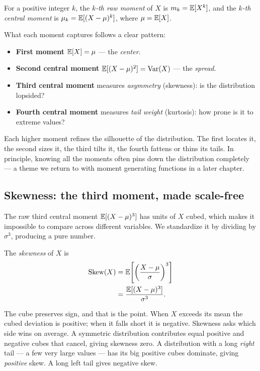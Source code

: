 \begin{definition}[Moments]
\label{ch09:def-moments}
For a positive integer $k$, the \emph{$k$-th raw moment} of $X$ is
$m_k = \operatorname{\mathbb{E}}[X^k]$, and the \emph{$k$-th central moment} is
$\mu_k = \operatorname{\mathbb{E}}[(X-\mu)^k]$, where $\mu = \operatorname{\mathbb{E}}[X]$.
\end{definition}

What each moment captures follows a clear pattern:

\begin{itemize}
  \item \textbf{First moment} $\operatorname{\mathbb{E}}[X] = \mu$ --- the \emph{center}.
  \item \textbf{Second central moment} $\operatorname{\mathbb{E}}[(X-\mu)^2] = \operatorname{Var}(X)$ --- the
        \emph{spread}.
  \item \textbf{Third central moment} measures \emph{asymmetry} (skewness):
        is the distribution lopsided?
  \item \textbf{Fourth central moment} measures \emph{tail weight}
        (kurtosis): how prone is it to extreme values?
\end{itemize}

Each higher moment refines the silhouette of the distribution. The first
locates it, the second sizes it, the third tilts it, the fourth fattens or
thins its tails. In principle, knowing all the moments often pins down the
distribution completely --- a theme we return to with moment generating
functions in a later chapter.

\subsection{Skewness: the third moment, made scale-free}

The raw third central moment $\operatorname{\mathbb{E}}[(X-\mu)^3]$ has units of $X$ cubed, which
makes it impossible to compare across different variables. We standardize it
by dividing by $\sigma^3$, producing a pure number.

\begin{definition}[Skewness]
\label{ch09:def-skew}
The \emph{skewness} of $X$ is
\begin{align*}
  \operatorname{Skew}(X) &= \operatorname{\mathbb{E}}\!\left[\left(\frac{X-\mu}{\sigma}\right)^{3}\right] \\
  &= \frac{\operatorname{\mathbb{E}}[(X-\mu)^3]}{\sigma^3}.
\end{align*}
\end{definition}

The cube preserves sign, and that is the point. When $X$ exceeds its mean the
cubed deviation is positive; when it falls short it is negative. Skewness asks
which side wins on average. A symmetric distribution contributes equal
positive and negative cubes that cancel, giving skewness zero. A distribution
with a long \emph{right} tail --- a few very large values --- has its big
positive cubes dominate, giving \emph{positive} skew. A long left tail gives
negative skew.

